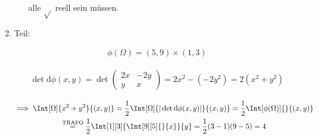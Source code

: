 \begin{solution}
\begin{enumerate}[label = \arabic*.]
\begin{enumerate}[label = \arabic*.]
        alle $\sqrt{}$ reell sein müssen.

    \end{enumerate}
    
    \item Teil:
    

    \begin{align*}
        \phi(\Omega) = (5, 9) \times (1, 3)
    \end{align*}

    \begin{align*}
        \det \mathrm{d} \phi(x, y)
        =
        \det
        \begin{pmatrix}
            2 x & -2 y \\
            y   &  x
        \end{pmatrix}
        =
        2 x^2 - (-2 y^2)
        =
        2 (x^2 + y^2)
    \end{align*}

    \begin{multline*}        
        \implies
        \Int[\Omega]{x^2 + y^2}{(x, y)}
        =
        \frac{1}{2}
        \Int[\Omega]{|\det \mathrm{d} \phi(x, y)|}{(x, y)}
        =
        \frac{1}{2}
        \Int[\phi(\Omega)]{}{(x, y)} \\
        \stackrel
        {
            \text{TRAFO}
        }{=}
        \frac{1}{2}
        \Int[1][3]
        {
            \Int[9][5]{}{x}
        }{y}
        =
        \frac{1}{2}
        (3 - 1)
        (9 - 5)
        = 4
    \end{multline*}

\end{enumerate}

\end{solution}

